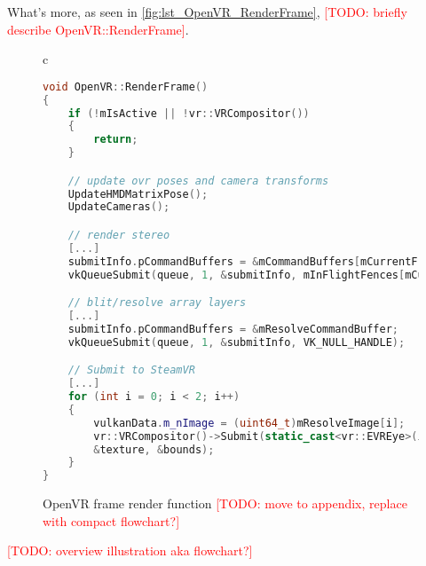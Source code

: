 What's more, as seen in \autoref{fig:lst_OpenVR_RenderFrame}, \textcolor{red}{[TODO: briefly describe OpenVR::RenderFrame]}. \\

\begin{figure}[htb]
  \centering
  \begin{tabular}{c}
  \begin{lstlisting}[language=C++]
void OpenVR::RenderFrame()
{
	if (!mIsActive || !vr::VRCompositor())
	{
		return;
	}

	// update ovr poses and camera transforms
	UpdateHMDMatrixPose();
	UpdateCameras();

	// render stereo
	[...]
	submitInfo.pCommandBuffers = &mCommandBuffers[mCurrentFrame];
	vkQueueSubmit(queue, 1, &submitInfo, mInFlightFences[mCurrentFrame]);

	// blit/resolve array layers
	[...]
	submitInfo.pCommandBuffers = &mResolveCommandBuffer;
	vkQueueSubmit(queue, 1, &submitInfo, VK_NULL_HANDLE);

	// Submit to SteamVR
	[...]
	for (int i = 0; i < 2; i++)
	{
		vulkanData.m_nImage = (uint64_t)mResolveImage[i];
		vr::VRCompositor()->Submit(static_cast<vr::EVREye>(i), 
		&texture, &bounds);
	}
}
	\end{lstlisting}
  \end{tabular}
  \caption[OpenVR render target's RenderFrame]{OpenVR frame render function \textcolor{red}{[TODO: move to appendix, replace with compact flowchart?]}}\label{fig:lst_OpenVR_RenderFrame}
\end{figure}

\textcolor{red}{[TODO: overview illustration aka flowchart?]}